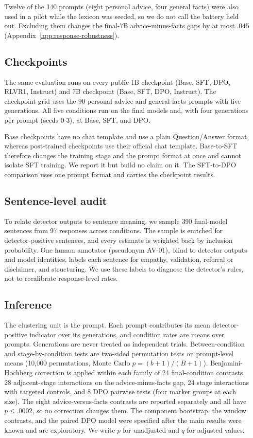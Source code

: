 \documentclass[11pt]{article}
\begin{document}
Twelve of the 140 prompts (eight personal advice, four general facts) were
also used in a pilot while the lexicon was seeded, so we do not call the
battery held out. Excluding them changes the final-7B advice-minus-facts gaps
by at most .045 (Appendix~\ref{app:response-robustness}).

\subsection{Checkpoints}
\label{sec:method-stagewise}
The same evaluation runs on every public 1B checkpoint
(Base, SFT, DPO, RLVR1, Instruct) and 7B checkpoint
(Base, SFT, DPO, Instruct). The checkpoint grid uses the 90
personal-advice and general-facts prompts with five generations. All five
conditions run on the final models and, with four generations per prompt
(seeds 0-3), at Base, SFT, and DPO.

Base checkpoints have no chat template and use a plain Question/Answer
format, whereas post-trained checkpoints use their official chat template.
Base-to-SFT therefore changes the training stage and the prompt format at
once and cannot isolate SFT training. We report it but build no claim on it.
The SFT-to-DPO comparison uses one prompt format and carries the checkpoint
results.

\subsection{Sentence-level audit}
\label{sec:method-audit}
To relate detector outputs to sentence meaning, we sample 390 final-model
sentences from 97 responses across conditions. The sample is enriched for
detector-positive sentences, and every estimate is weighted back by inclusion
probability. One human annotator (pseudonym AV-01), blind to detector outputs
and model identities, labels each sentence for empathy, validation, referral
or disclaimer, and structuring. We use these labels to diagnose the
detector's rules, not to recalibrate response-level rates.

\subsection{Inference}
\label{sec:method-stats}
The clustering unit is the prompt. Each prompt contributes its mean
detector-positive indicator over its generations, and condition rates are
means over prompts. Generations are never treated as independent trials.
Between-condition and stage-by-condition tests are two-sided permutation tests
on prompt-level means (10{,}000 permutations, Monte Carlo
$p=(b+1)/(B+1)$). Benjamini-Hochberg correction is applied within each
family of 24 final-condition contrasts, 28 adjacent-stage interactions on the
advice-minus-facts gap, 24 stage interactions with targeted controls, and 8
DPO pairwise tests (four marker groups at each size). The eight
advice-versus-facts contrasts are reported separately and all have
$p\leq.0002$, so no correction changes them. The component bootstrap, the
window contrasts, and the paired DPO model were specified after the main
results were known and are exploratory. We write $p$ for unadjusted and $q$ for adjusted values.
\end{document}
